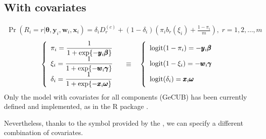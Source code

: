 \documentclass[letterpaper,10pt,english]{sphinxmanual}
\begin{document}
\subsection{With covariates}
\label{\detokenize{manual:cubsh-with-covariates}}\label{\detokenize{manual:id17}}
\sphinxAtStartPar
{}
\begin{equation*}
\begin{split}\Pr(R_i=r|\pmb\theta, \pmb y_i, \pmb w_i, \pmb x_i) = \delta_i D_r^{(c)} + (1-\delta_i)\left(\pi_i b_r(\xi_i) + \frac{1-\pi_i}{m} \right)
,\; r=1,2,\ldots,m\end{split}
\end{equation*}\begin{equation*}
\begin{split}\left\{
\begin{array}{l}
    \pi_i = \dfrac{1}{1+\exp\{-\pmb y_i \pmb \beta\}}
    \\
    \xi_i = \dfrac{1}{1+\exp\{-\pmb w_i \pmb \gamma\}}
    \\
    \delta_i = \dfrac{1}{1+\exp\{-\pmb x_i \pmb \omega\}}
\end{array}
\right.
\quad \equiv \quad
\left\{
\begin{array}{l}
    \mathrm{logit}(1-\pi_i) = -\pmb y_i \pmb \beta
    \vphantom{\dfrac{1}{1+\exp\{-\pmb y_i \pmb \beta\}}}
    \\
    \mathrm{logit}(1-\xi_i) = -\pmb w_i \pmb \gamma
    \vphantom{\dfrac{1}{1+\exp\{-\pmb w_i \pmb \gamma\}}}
    \\
    \mathrm{logit}(\delta_i) = \pmb x_i \pmb \omega
    \vphantom{\dfrac{1}{1+\exp\{-\pmb x_i \pmb \omega\}}}
\end{array}
\right.\end{split}
\end{equation*}
\sphinxAtStartPar
Only the model with covariates for all components (GeCUB) has been
currently defined and implemented, as in the R package .

\sphinxAtStartPar
Nevertheless, thanks to the symbol  provided by the
, we can specify a different combination
of covariates.
\end{document}
